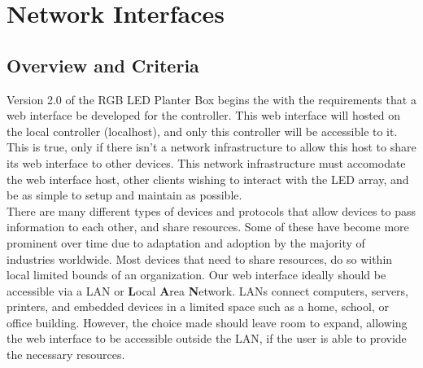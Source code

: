 \documentclass[onecolumn, draftclsnofoot,10pt, compsoc]{IEEEtran}
\begin{document}
\newpage

\tableofcontents
\clearpage
\singlespace

\newpage





	\section{Network Interfaces}

		\subsection{Overview and Criteria}
		Version 2.0 of the RGB LED Planter Box begins the with the requirements that a web interface be developed for the controller.
		This web interface will hosted on the local controller (localhost), and only this controller will be accessible to it.
		This is true, only if there isn't a network infrastructure to allow this host to share its web interface to other devices.
	  This network infrastructure must accomodate the web interface host, other clients wishing to interact with the LED array, and
		be as simple to setup and maintain as possible.  \\ 

		There are many different types of devices and protocols that allow devices to pass information to each other, and share resources.
		Some of these have become more prominent over time due to adaptation and adoption by the majority of industries worldwide.
		Most devices that need to share resources, do so within local limited bounds of an organization.
		Our web interface ideally should be accessible via a LAN or \textbf{L}ocal \textbf{A}rea \textbf{N}etwork.
		LANs connect computers, servers, printers, and embedded devices in a limited space such as a home, school, or office building. \cite{LAN1}
		However, the choice made should leave room to expand, allowing the web interface to be accessible outside the LAN, if the user is able to provide the necessary resources.
\end{document}
